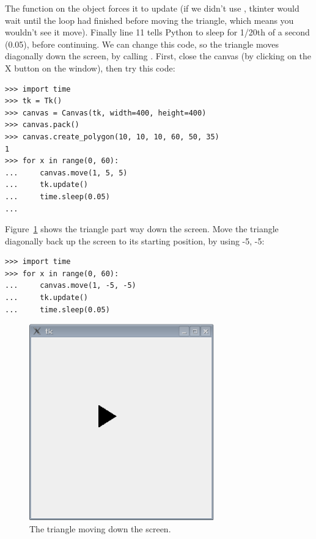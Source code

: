 The function  on the  object forces it to update (if we didn't use , tkinter would wait until the loop had finished before moving the triangle, which means you wouldn't see it move). Finally line 11 tells Python to sleep for 1/20th of a second (0.05), before continuing. We can change this code, so the triangle moves diagonally down the screen, by calling .  First, close the canvas (by clicking on the X button on the window), then try this code:

\begin{listing}
\begin{verbatim}
>>> import time
>>> tk = Tk()
>>> canvas = Canvas(tk, width=400, height=400)
>>> canvas.pack()
>>> canvas.create_polygon(10, 10, 10, 60, 50, 35)
1
>>> for x in range(0, 60):
...     canvas.move(1, 5, 5)
...     tk.update()
...     time.sleep(0.05)
...
\end{verbatim}
\end{listing}

Figure~\ref{fig45} shows the triangle part way down the screen. Move the triangle diagonally back up the screen to its starting position, by using -5, -5:

\begin{listing}
\begin{verbatim}
>>> import time
>>> for x in range(0, 60):
...     canvas.move(1, -5, -5)
...     tk.update()
...     time.sleep(0.05)
\end{verbatim}
\end{listing}

\begin{figure}
\begin{center}
\includegraphics[width=80mm]{../en/figure45.eps}
\end{center}
\caption{The triangle moving down the screen.}\label{fig45}
\end{figure}

